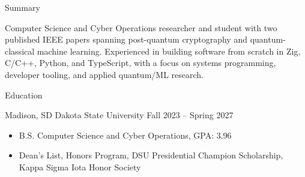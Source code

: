 \documentclass[]{mcdowellcv}
\begin{document}
\makeheader
\begin{cvsection}
    {Summary}
    \begin{cvsubsection}
        {}
        {}
        {}
        \vspace{0.3em}
        Computer Science and Cyber Operations researcher and student
        with two published IEEE papers spanning post-quantum
        cryptography and quantum-classical machine learning.
        Experienced in building software from scratch in Zig, C/C++,
        Python, and TypeScript, with a focus on systems programming,
        developer tooling, and applied quantum/ML research.
    \end{cvsubsection}
\end{cvsection}
\begin{cvsection}
    {Education}
    \begin{cvsubsection}
        {Madison, SD}
        {Dakota State University}
        {Fall 2023 -- Spring 2027}
        \begin{itemize}
            \item{
                    B.S. Computer Science and Cyber Operations, GPA: 3.96
                }
            \item{
                    Dean's List, Honors Program, DSU Presidential
                    Champion Scholarship, Kappa Sigma Iota Honor Society
                }
        \end{itemize}
    \end{cvsubsection}
\end{cvsection}
\end{document}
